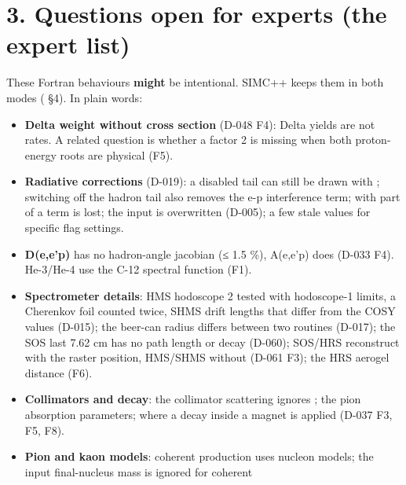 \section*{\texorpdfstring{3. Questions open for experts (the expert list)}{3. Questions open for experts (the expert list)}}\label{translation_report-useru5fdifferences:3-questions-open-for-experts-the-expert-list}
These Fortran behaviours \textbf{might} be intentional. SIMC++ keeps them in both modes ( §4).
In plain words:

\begin{itemize}
\item \textbf{Delta weight without cross section} (D-048 F4): Delta yields are not rates. A related question is whether a factor
2 is missing when both proton-energy roots are physical (F5).
\item \textbf{Radiative corrections} (D-019): a disabled tail can still be drawn with ; switching off the hadron tail
also removes the e-p interference term; with  part of a term is lost; the input  is
overwritten (D-005); a few stale values for specific flag settings.
\item \textbf{D(e,e'p)} has no hadron-angle jacobian (≤ 1.5 \%), A(e,e'p) does (D-033 F4). He-3/He-4 use the C-12 spectral
function (F1).
\item \textbf{Spectrometer details}: HMS hodoscope 2 tested with hodoscope-1 limits, a Cherenkov foil counted twice, SHMS drift
lengths that differ from the COSY values (D-015); the beer-can radius differs between two routines (D-017); the SOS last
7.62 cm has no path length or decay (D-060); SOS/HRS reconstruct with the raster position, HMS/SHMS without (D-061 F3);
the HRS aerogel distance (F6).
\item \textbf{Collimators and decay}: the collimator scattering ignores ; the pion absorption parameters; where a decay
inside a magnet is applied (D-037 F3, F5, F8).
\item \textbf{Pion and kaon models}: coherent production uses nucleon models; the input final-nucleus mass is ignored for coherent

\end{itemize}
